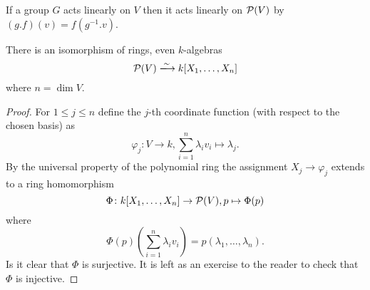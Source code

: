 \begin{rem}
 If a group $G$ acts linearly on $V$ then it acts linearly on $\mathcal{P}(V)$ by $(g.f)(v) = f\left(g^{-1}.v\right)$.
\end{rem}


\begin{lem}
 There is an isomorphism of rings, even $k$-algebras
 \[
  \mc{P}(V) \xlongrightarrow{\sim} k[X_1, \dotsc, X_n]
 \]
 where $n = \dim V$.
\end{lem}
\begin{proof}
 For $1 \leq j \leq n$ define the $j$-th coordinate function (with respect to the chosen basis) as
 \[
  \varphi_j \colon V \to k, \sum_{i=1}^n \lambda_i v_i \mapsto \lambda_j.
 \]
 By the universal property of the polynomial ring the assignment $X_j \to \varphi_j$ extends to a ring homomorphism
 \[
  \Phi \colon k[X_1, \dotsc, X_n] \to \mathcal{P}(V), p \mapsto \Phi(p)
 \]
 where
 \[
  \Phi(p)\left(\sum_{i=1}^n \lambda_i v_i\right) = p(\lambda_1, \dotsc, \lambda_n).
 \]
 Is it clear that $\Phi$ is surjective. It is left as an exercise to the reader to check that $\Phi$ is injective.
\end{proof}


